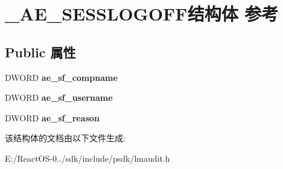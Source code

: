 \hypertarget{struct___a_e___s_e_s_s_l_o_g_o_f_f}{}\section{\+\_\+\+A\+E\+\_\+\+S\+E\+S\+S\+L\+O\+G\+O\+F\+F结构体 参考}
\label{struct___a_e___s_e_s_s_l_o_g_o_f_f}
\subsection*{Public 属性}
\begin{DoxyCompactItemize}
\item 
\mbox{\label{struct___a_e___s_e_s_s_l_o_g_o_f_f_ad2c046ade239cdff5f9df0c716ffa0f8}} 
D\+W\+O\+RD {\bfseries ae\+\_\+sf\+\_\+compname}
\item 
\mbox{\label{struct___a_e___s_e_s_s_l_o_g_o_f_f_aa656febe354f8d6770638a2b3a8166f7}} 
D\+W\+O\+RD {\bfseries ae\+\_\+sf\+\_\+username}
\item 
\mbox{\label{struct___a_e___s_e_s_s_l_o_g_o_f_f_a277da38159b75c146610cc8cfedb8871}} 
D\+W\+O\+RD {\bfseries ae\+\_\+sf\+\_\+reason}
\end{DoxyCompactItemize}


该结构体的文档由以下文件生成\+:\begin{DoxyCompactItemize}
\item 
E\+:/\+React\+O\+S-\/0../sdk/include/psdk/lmaudit.\+h\end{DoxyCompactItemize}
